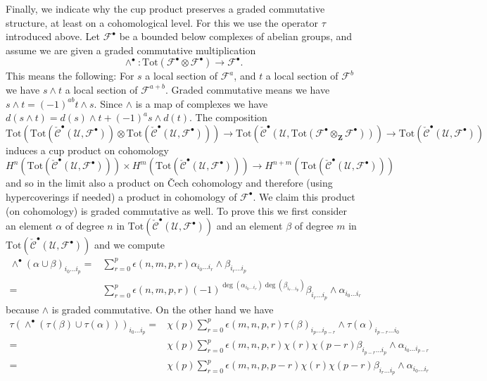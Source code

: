 \medskip\noindent
Finally, we indicate why the cup product preserves a graded commutative
structure, at least on a cohomological level. For this we use the operator
$\tau$ introduced above. Let ${\mathcal F}^\bullet$ be a bounded below
complexes of abelian groups, and assume we are given a graded commutative
multiplication
$$
\wedge^\bullet :
\text{Tot}({\mathcal F}^\bullet\otimes {\mathcal F}^\bullet)
\longrightarrow
{\mathcal F}^\bullet.
$$
This means the following: For $s$ a local section of
${\mathcal F}^a$, and $t$ a local section of ${\mathcal F}^b$
we have $s \wedge t$ a local section of ${\mathcal F}^{a + b}$.
Graded commutative means we have
$s \wedge t = (-1)^{ab} t \wedge s$. Since $\wedge$ is a map
of complexes we have
$d(s\wedge t) = d(s) \wedge t + (-1)^a s \wedge d(t)$.
The composition
$$
\text{Tot}(
\text{Tot}(\check{\mathcal{C}}^\bullet({\mathcal U}, {\mathcal F}^\bullet))
\otimes
\text{Tot}(\check{\mathcal{C}}^\bullet({\mathcal U}, {\mathcal F}^\bullet))
)
\to
\text{Tot}(
\check{\mathcal{C}}^\bullet({\mathcal U},
\text{Tot}({\mathcal F}^\bullet\otimes_{\mathbf Z}{\mathcal F}^\bullet))
)
\to
\text{Tot}(\check{\mathcal{C}}^\bullet({\mathcal U}, {\mathcal F}^\bullet))
$$
induces a cup product on cohomology
$$
H^n(
\text{Tot}(\check{\mathcal{C}}^\bullet({\mathcal U}, {\mathcal F}^\bullet))
)
\times
H^m(
\text{Tot}(\check{\mathcal{C}}^\bullet({\mathcal U}, {\mathcal F}^\bullet))
)
\longrightarrow
H^{n + m}(
\text{Tot}(\check{\mathcal{C}}^\bullet({\mathcal U}, {\mathcal F}^\bullet))
)
$$
and so in the limit also a product on {\v C}ech cohomology
and therefore (using hypercoverings if needed) a product
in cohomology of ${\mathcal F}^\bullet$. We claim this product
(on cohomology) is graded commutative as well. To prove this
we first consider an element $\alpha$ of degree $n$ in
$\text{Tot}(\check{\mathcal{C}}^\bullet({\mathcal U}, {\mathcal F}^\bullet))$
and an element $\beta$ of degree $m$ in
$\text{Tot}(\check{\mathcal{C}}^\bullet({\mathcal U}, {\mathcal F}^\bullet))$
and we compute
\begin{align*}
\wedge^\bullet(\alpha \cup \beta)_{i_0 \ldots i_p}
= &
\sum\nolimits_{r = 0}^p
\epsilon(n, m, p, r)
\alpha_{i_0 \ldots i_r} \wedge \beta_{i_r \ldots i_p} \\
= &
\sum\nolimits_{r = 0}^p
\epsilon(n, m, p, r)
(-1)^{\deg(\alpha_{i_0 \ldots i_r})\deg(\beta_{i_r \ldots i_p})}
\beta_{i_r \ldots i_p} \wedge \alpha_{i_0 \ldots i_r}
\end{align*}
because $\wedge$ is graded commutative. On the other hand we have
\begin{align*}
\tau(\wedge^\bullet(\tau(\beta) \cup \tau(\alpha)))_{i_0 \ldots i_p}
= &
\chi(p)
\sum\nolimits_{r = 0}^p
\epsilon(m, n, p, r)
\tau(\beta)_{i_p \ldots i_{p - r}} \wedge \tau(\alpha)_{i_{p - r} \ldots i_0}
\\
= &
\chi(p)
\sum\nolimits_{r = 0}^p
\epsilon(m, n, p, r) \chi(r) \chi(p - r)
\beta_{i_{p - r} \ldots i_p} \wedge \alpha_{i_0 \ldots i_{p - r}}
\\
= &
\chi(p)
\sum\nolimits_{r = 0}^p
\epsilon(m, n, p, p - r) \chi(r) \chi(p - r)
\beta_{i_r \ldots i_p} \wedge \alpha_{i_0 \ldots i_r}
\end{align*}
